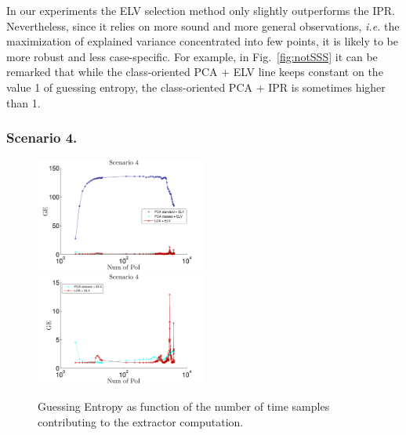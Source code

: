 \begin{remark}
In our experiments the ELV selection method only slightly outperforms the IPR. Nevertheless, since it relies on more sound and more general observations, {\em i.e.} the maximization of explained variance concentrated into few points, it is likely to be more robust and less case-specific. For example, in Fig.~\ref{fig:notSSS} it can be remarked that while the class-oriented PCA + ELV line keeps constant on the value 1 of guessing entropy, the class-oriented PCA + IPR is sometimes higher than 1.
\end{remark}

\subsubsection{Scenario 4.}

\begin{figure}
\includegraphics[width=0.5\textwidth]{../Figures/CARDIS2015/Criterion4.pdf}
\includegraphics[width=0.5\textwidth]{../Figures/CARDIS2015/Criterion4cutted.pdf} 
\caption{Guessing Entropy as function of the number of time samples contributing to the extractor computation.}\label{fig:4}
\end{figure}

